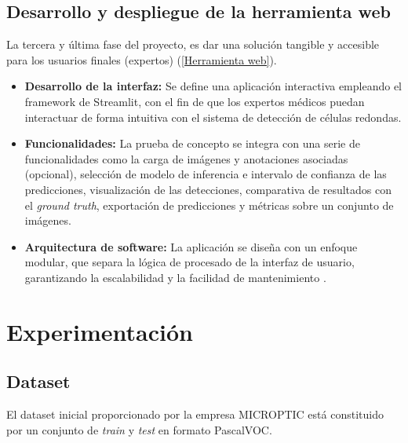 \documentclass[12pt,a4paper,onecolumn,oneside]{report}
\begin{document}
\section{Desarrollo y despliegue de la herramienta web}
\label{Despliegue de la herramienta web}

La tercera y última fase del proyecto, es dar una solución tangible y accesible para los usuarios finales (expertos) (\autoref{Herramienta web}).

\begin{itemize}
  \item \textbf{Desarrollo de la interfaz:} Se define una aplicación interactiva empleando el framework de Streamlit, con el fin de que los expertos médicos puedan interactuar de forma intuitiva con el sistema de detección de células redondas.
  \item \textbf{Funcionalidades:} La prueba de concepto se integra con una serie de funcionalidades como la carga de imágenes y anotaciones asociadas (opcional), selección de modelo de inferencia e intervalo de confianza de las predicciones, 
  visualización de las detecciones, comparativa de resultados con el \textit{ground truth}, exportación de predicciones y métricas sobre un conjunto de imágenes. 
  \item \textbf{Arquitectura de software:} La aplicación se diseña con un enfoque modular, que separa la lógica de procesado de la interfaz de usuario, garantizando la escalabilidad y la facilidad de mantenimiento \cite{repoTFM}.
\end{itemize}

\chapter{Experimentación} %
\label{Experimentación}

\section{Dataset}
\label{sec:Dataset}
El dataset inicial proporcionado por la empresa MICROPTIC \cite{microptic} está constituido por un conjunto de \textit{train} y \textit{test} en formato PascalVOC.
\end{document}

